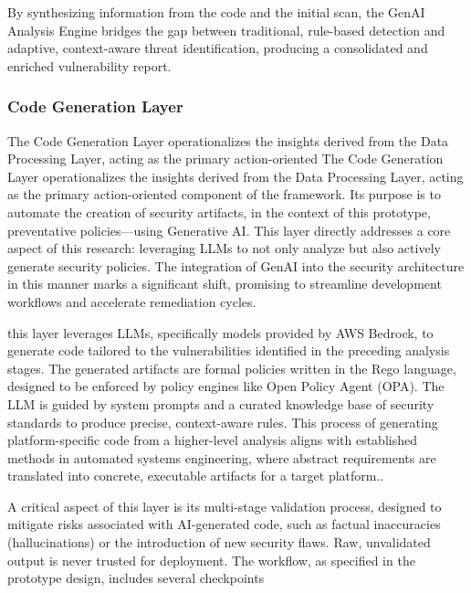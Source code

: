 By synthesizing information from the code and the initial scan, the GenAI Analysis Engine bridges the gap between traditional, rule-based detection and adaptive, context-aware threat identification, producing a consolidated and enriched vulnerability report.


\subsubsection{Code Generation Layer} %
\label{sec:Code Generation Laye}

The Code Generation Layer operationalizes the insights derived from the Data Processing Layer, acting as the primary action-oriented The Code Generation Layer operationalizes the insights derived from the Data Processing Layer, acting as the primary action-oriented component of the framework. Its purpose is to automate the creation of security artifacts, in the context of this prototype, preventative policies—using Generative AI. This layer directly addresses a core aspect of this research: leveraging LLMs to not only analyze but also actively generate security policies. The integration of GenAI into the security architecture in this manner marks a significant shift, promising to streamline development workflows and accelerate remediation cycles\cite{kumar_generative_nodate}.

this layer leverages LLMs, specifically models provided by AWS Bedrock, to generate code tailored to the vulnerabilities identified in the preceding analysis stages. The generated artifacts are formal policies written in the Rego language, designed to be enforced by policy engines like Open Policy Agent (OPA). The LLM is guided by system prompts and a curated knowledge base of security standards to produce precise, context-aware rules. This process of generating platform-specific code from a higher-level analysis aligns with established methods in automated systems engineering, where abstract requirements are translated into concrete, executable artifacts for a target platform.\cite{chen_platform-specific_2025}.

A critical aspect of this layer is its multi-stage validation process, designed to mitigate risks associated with AI-generated code, such as factual inaccuracies (hallucinations) or the introduction of new security flaws\cite{kumar_generative_nodate}. Raw, unvalidated output is never trusted for deployment. The workflow, as specified in the prototype design, includes several checkpoints

